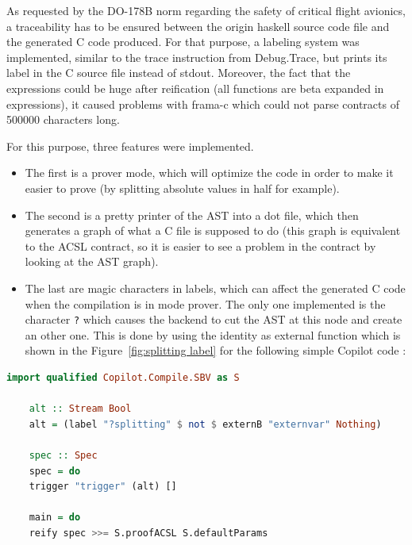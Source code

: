 As requested by the DO-178B norm regarding the safety of critical flight avionics, a traceability has to be ensured between the origin haskell source code file and the generated C code produced. For that purpose, a labeling system was implemented, similar to the trace instruction from Debug.Trace, but prints its label in the C source file instead of stdout. Moreover, the fact that the expressions could be huge after reification (all functions are beta expanded in expressions), it caused problems with frama-c which could not parse contracts of 500000 characters long. 

For this purpose, three features were implemented. 
\begin{itemize}
	\item The first is a prover mode, which will optimize the code in order to make it easier to prove (by splitting absolute values in half for example).
	\item The second is a pretty printer of the AST into a dot file, which then generates a graph of what a C file is supposed to do (this graph is equivalent to the ACSL contract, so it is easier to see a problem in the contract by looking at the AST graph).
	\item The last are magic characters in labels, which can affect the generated C code when the compilation is in mode prover. The only one implemented is the character \texttt{?} which causes the backend to cut the AST at this node and create an other one. This is done by using the identity as external function which is shown in the Figure~\ref{fig:splitting label} for the following simple Copilot code :
\end{itemize} 
\begin{lstlisting}[frame=single,language=haskell]
	import qualified Copilot.Compile.SBV as S
	
	alt :: Stream Bool
	alt = (label "?splitting" $ not $ externB "externvar" Nothing)
	
	spec :: Spec
	spec = do
	trigger "trigger" (alt) []
	
	main = do
	reify spec >>= S.proofACSL S.defaultParams
\end{lstlisting}

